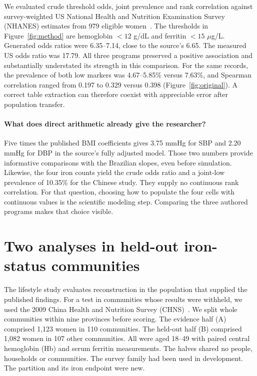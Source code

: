 \documentclass[sigconf,anonymous,review]{acmart}
\begin{document}
We evaluated crude threshold odds, joint prevalence and rank correlation against survey-weighted US National Health and Nutrition Examination Survey (NHANES) estimates from 979 eligible women~\cite{nhanes}. The thresholds in Figure~\ref{fig:method} are hemoglobin $<12$ g/dL and ferritin $<15$ $\mu$g/L. Generated odds ratios were 6.35--7.14, close to the source's 6.65. The measured US odds ratio was 17.79. All three programs preserved a positive association and substantially understated its strength in this comparison. For the same records, the prevalence of both low markers was 4.67--5.85\% versus 7.63\%, and Spearman correlation ranged from 0.197 to 0.329 versus 0.398 (Figure~\ref{fig:original}). A correct table extraction can therefore coexist with appreciable error after population transfer.

\paragraph{What does direct arithmetic already give the researcher?}
Five times the published BMI coefficients gives 3.75 mmHg for SBP and 2.20 mmHg for DBP in the source's fully adjusted model. Those two numbers provide informative comparisons with the Brazilian slopes, even before simulation. Likewise, the four iron counts yield the crude odds ratio and a joint-low prevalence of 10.35\% for the Chinese study. They supply no continuous rank correlation. For that question, choosing how to populate the four cells with continuous values is the scientific modeling step. Comparing the three authored programs makes that choice visible.

\section{Two analyses in held-out iron-status communities}
\label{sec:chns}
The lifestyle study evaluates reconstruction in the population that supplied the published findings. For a test in communities whose results were withheld, we used the 2009 China Health and Nutrition Survey (CHNS)~\cite{chnsbio,chnsind}. We split whole communities within nine provinces before scoring. The evidence half (A) comprised 1,123 women in 110 communities. The held-out half (B) comprised 1,082 women in 107 other communities. All were aged 18--49 with paired central hemoglobin (Hb) and serum ferritin measurements. The halves shared no people, households or communities. The survey family had been used in development. The partition and its iron endpoint were new.
\end{document}
